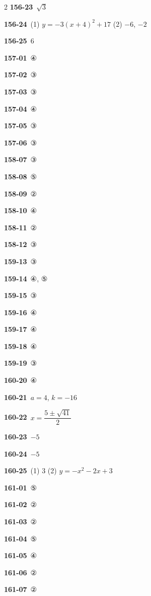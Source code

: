 \documentclass[10pt,a4paper]{article}
\begin{document}
\begin{multicols}{2}
\noindent\textbf{156-23}\ $\sqrt{3}$\par
\noindent\textbf{156-24}\ (1) $y=-3(x+4)^2+17$ (2) $-6$, $-2$\par
\noindent\textbf{156-25}\ $6$\par
\noindent\textbf{157-01}\ ④\par
\noindent\textbf{157-02}\ ③\par
\noindent\textbf{157-03}\ ③\par
\noindent\textbf{157-04}\ ④\par
\noindent\textbf{157-05}\ ③\par
\noindent\textbf{157-06}\ ③\par
\noindent\textbf{158-07}\ ③\par
\noindent\textbf{158-08}\ ⑤\par
\noindent\textbf{158-09}\ ②\par
\noindent\textbf{158-10}\ ④\par
\noindent\textbf{158-11}\ ②\par
\noindent\textbf{158-12}\ ③\par
\noindent\textbf{159-13}\ ③\par
\noindent\textbf{159-14}\ ④, ⑤\par
\noindent\textbf{159-15}\ ③\par
\noindent\textbf{159-16}\ ④\par
\noindent\textbf{159-17}\ ④\par
\noindent\textbf{159-18}\ ④\par
\noindent\textbf{159-19}\ ③\par
\noindent\textbf{160-20}\ ④\par
\noindent\textbf{160-21}\ $a=4$, $k=-16$\par
\noindent\textbf{160-22}\ $x=\dfrac{5\pm\sqrt{41}}{2}$\par
\noindent\textbf{160-23}\ $-5$\par
\noindent\textbf{160-24}\ $-5$\par
\noindent\textbf{160-25}\ (1) $3$ (2) $y=-x^2-2x+3$\par
\noindent\textbf{161-01}\ ⑤\par
\noindent\textbf{161-02}\ ②\par
\noindent\textbf{161-03}\ ②\par
\noindent\textbf{161-04}\ ⑤\par
\noindent\textbf{161-05}\ ④\par
\noindent\textbf{161-06}\ ②\par
\noindent\textbf{161-07}\ ②\par

\end{multicols}
\end{document}
